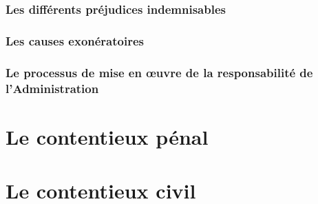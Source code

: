 		\subsubsection{Les différents préjudices indemnisables}
		
		\subsubsection{Les causes exonératoires}
		
		\subsubsection{Le processus de mise en œuvre de la responsabilité de l'Administration}
		
\section{Le contentieux pénal}

\section{Le contentieux civil}